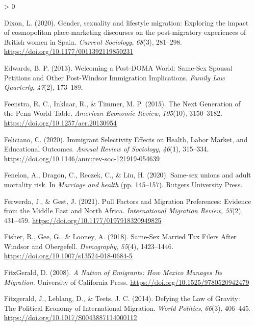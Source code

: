 \documentclass[
  12pt,
]{article}
\newlength{\cslhangindent}
\newenvironment{CSLReferences}[2] %
 {%
  \setlength{\parindent}{0pt}
  \ifodd #1 \everypar{\setlength{\hangindent}{\cslhangindent}}\ignorespaces\fi
  \ifnum #2 > 0
  \setlength{\parskip}{#2\baselineskip}
  \fi
 }%
 {}
\begin{document}
\begin{CSLReferences}{1}{0}
\leavevmode\hypertarget{ref-dixon_2020}{}%
Dixon, L. (2020). Gender, sexuality and lifestyle migration: Exploring the impact of cosmopolitan place-marketing discourses on the post-migratory experiences of {British} women in {Spain}. \emph{Current Sociology}, \emph{68}(3), 281--298. \url{https://doi.org/10.1177/0011392119850231}

\leavevmode\hypertarget{ref-edwards_2013}{}%
Edwards, B. P. (2013). Welcoming a {Post}-{DOMA World}: Same-{Sex Spousal Petitions} and {Other Post}-{Windsor Immigration Implications}. \emph{Family Law Quarterly}, \emph{47}(2), 173--189.

\leavevmode\hypertarget{ref-feenstra_2015}{}%
Feenstra, R. C., Inklaar, R., \& Timmer, M. P. (2015). The {Next Generation} of the {Penn World Table}. \emph{American Economic Review}, \emph{105}(10), 3150--3182. \url{https://doi.org/10.1257/aer.20130954}

\leavevmode\hypertarget{ref-feliciano_2020}{}%
Feliciano, C. (2020). Immigrant {Selectivity Effects} on {Health}, {Labor Market}, and {Educational Outcomes}. \emph{Annual Review of Sociology}, \emph{46}(1), 315--334. \url{https://doi.org/10.1146/annurev-soc-121919-054639}

\leavevmode\hypertarget{ref-fenelon_2020_samesex}{}%
Fenelon, A., Dragon, C., Reczek, C., \& Liu, H. (2020). Same-sex unions and adult mortality risk. In \emph{Marriage and health} (pp. 145--157). {Rutgers University Press}.

\leavevmode\hypertarget{ref-ferwerda_2021_pull}{}%
Ferwerda, J., \& Gest, J. (2021). Pull {Factors} and {Migration Preferences}: Evidence from the {Middle East} and {North Africa}. \emph{International Migration Review}, \emph{55}(2), 431--459. \url{https://doi.org/10.1177/0197918320949825}

\leavevmode\hypertarget{ref-fisher_2018}{}%
Fisher, R., Gee, G., \& Looney, A. (2018). Same-{Sex Married Tax Filers After Windsor} and {Obergefell}. \emph{Demography}, \emph{55}(4), 1423--1446. \url{https://doi.org/10.1007/s13524-018-0684-5}

\leavevmode\hypertarget{ref-fitzgerald_2008}{}%
FitzGerald, D. (2008). \emph{A {Nation} of {Emigrants}: How {Mexico Manages Its Migration}}. {University of California Press}. \url{https://doi.org/10.1525/9780520942479}

\leavevmode\hypertarget{ref-fitzgerald_2014}{}%
Fitzgerald, J., Leblang, D., \& Teets, J. C. (2014). Defying the {Law} of {Gravity}: The {Political Economy} of {International Migration}. \emph{World Politics}, \emph{66}(3), 406--445. \url{https://doi.org/10.1017/S0043887114000112}


\end{CSLReferences}
\end{document}
